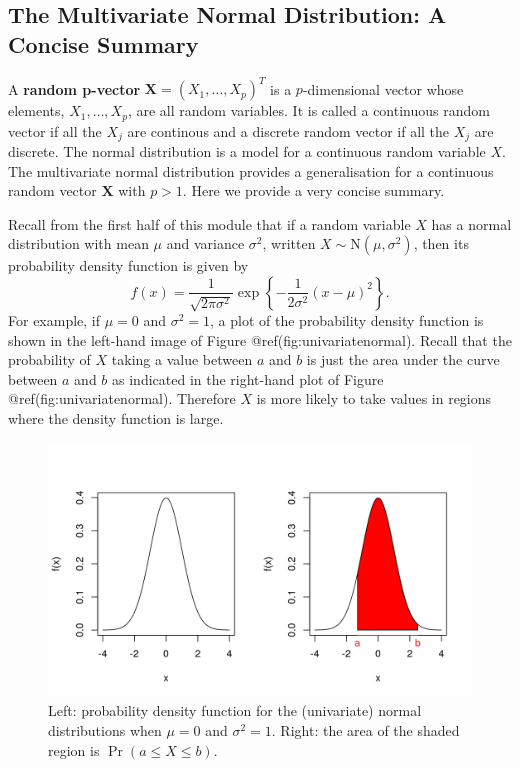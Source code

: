 \documentclass[
]{article}
\begin{document}
\hypertarget{the-multivariate-normal-distribution-a-concise-summary}{%
\subsection{The Multivariate Normal Distribution: A Concise
Summary}\label{the-multivariate-normal-distribution-a-concise-summary}}

A \textbf{random p-vector} \(\boldsymbol{X} = (X_1,\ldots,X_p)^T\) is a
\(p\)-dimensional vector whose elements, \(X_1,\ldots,X_p\), are all
random variables. It is called a continuous random vector if all the
\(X_j\) are continous and a discrete random vector if all the \(X_j\)
are discrete. The normal distribution is a model for a continuous random
variable \(X\). The multivariate normal distribution provides a
generalisation for a continuous random vector \(\boldsymbol{X}\) with
\(p>1\). Here we provide a very concise summary.

Recall from the first half of this module that if a random variable
\(X\) has a normal distribution with mean \(\mu\) and variance
\(\sigma^2\), written \(X \sim \mathrm{N}(\mu, \sigma^2)\), then its
probability density function is given by \begin{equation*}
f(x) = \frac{1}{\sqrt{2 \pi \sigma^2}} \exp \left\{ -\frac{1}{2 \sigma^2}(x-\mu)^2 \right\}.
\end{equation*} For example, if \(\mu=0\) and \(\sigma^2=1\), a plot of
the probability density function is shown in the left-hand image of
Figure @ref(fig:univariatenormal). Recall that the probability of \(X\)
taking a value between \(a\) and \(b\) is just the area under the curve
between \(a\) and \(b\) as indicated in the right-hand plot of Figure
@ref(fig:univariatenormal). Therefore \(X\) is more likely to take
values in regions where the density function is large.

\begin{figure}[th]

{\centering \includegraphics{univariatenormal-1} 

}

\caption{Left: probability density function for the (univariate) normal distributions when $\mu=0$ and $\sigma^2=1$. Right: the area of the shaded region is $\Pr(a \le X \le b)$.}\label{fig:univariatenormal}
\end{figure}
\end{document}
